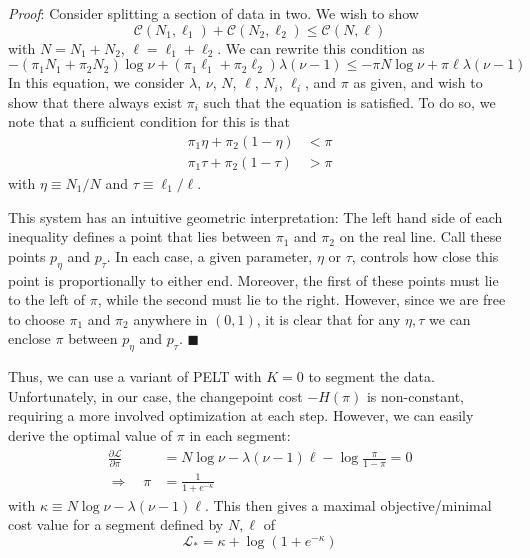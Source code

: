 \documentclass[11pt]{article}
\begin{document}
\emph{Proof}: Consider splitting a section of data in two. We wish to show
\begin{equation}
    \mathcal{C}(N_1, \ell_1) + \mathcal{C}(N_2, \ell_2) \le \mathcal{C}(N, \ell)
\end{equation}
with $N = N_1 + N_2$, $\ell = \ell_1 + \ell_2$. We can rewrite this condition as
\begin{equation}
    -(\pi_1 N_1 + \pi_2 N_2) \log \nu + (\pi_1 \ell_1 + \pi_2 \ell_2) \lambda (\nu - 1)
    \le
    -\pi N \log \nu + \pi \ell \lambda (\nu - 1)
\end{equation}
In this equation, we consider $\lambda$, $\nu$, $N$, $\ell$, $N_i$, $\ell_i$, and $\pi$ as given, and wish to show that there always exist $\pi_i$ such that the equation is satisfied. To do so, we note that a sufficient condition for this is that
\begin{align}
    \pi_1 \eta + \pi_2 (1 - \eta) &< \pi \\
    \pi_1 \tau + \pi_2 (1 - \tau) &> \pi
\end{align}
with $\eta \equiv N_1/N$ and $\tau \equiv \ell_1/\ell$.

This system has an intuitive geometric interpretation: The left hand side of each inequality defines a point that lies between $\pi_1$ and $\pi_2$ on the real line. Call these points $p_\eta$ and $p_\tau$. In each case, a given parameter, $\eta$ or $\tau$, controls how close this point is proportionally to either end. Moreover, the first of these points must lie to the left of $\pi$, while the second must lie to the right. However, since we are free to choose $\pi_1$ and $\pi_2$ anywhere in $(0, 1)$, it is clear that for any $\eta, \tau$ we can enclose $\pi$ between $p_\eta$ and $p_\tau$. $\blacksquare$

Thus, we can use a variant of PELT with $K = 0$ to segment the data. Unfortunately, in our case, the changepoint cost $-H(\pi)$ is non-constant, requiring a more involved optimization at each step. However, we can easily derive the optimal value of $\pi$ in each segment:
\begin{align}
    \frac{\partial \mathcal{L}}{\partial \pi} &= N\log \nu - \lambda (\nu - 1)\ell - \log \frac{\pi}{1-\pi} = 0 \\
    \Rightarrow \quad \pi &= \frac{1}{1 + e^{-\kappa}}
\end{align}
with $\kappa \equiv N\log \nu - \lambda (\nu - 1)\ell$. This then gives a maximal objective/minimal cost value for a segment defined by $N, \ell$ of
\begin{equation}
    \mathcal{L}_* = \kappa + \log (1 + e^{-\kappa})
\end{equation}
\end{document}

